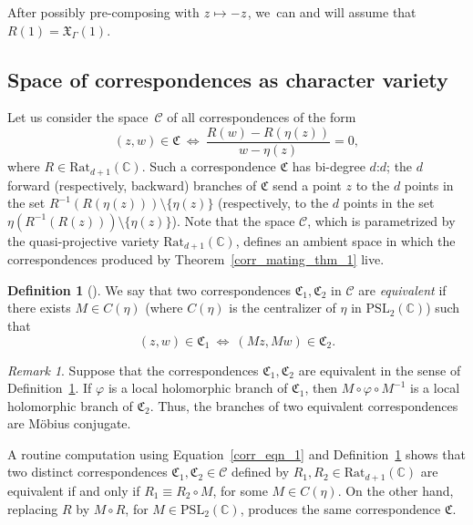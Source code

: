 \documentclass[JEP,XML,SOM,Unicode,NoFloatCountersInSection,published]{cedram}
\def\mto{\mathchoice{\longmapsto}{\mapsto}{\mapsto}{\mapsto}}
\theoremstyle{definition}
\newtheorem{definition}[lemma]{Definition}
\theoremstyle{remark}
\newtheorem{remark}[lemma]{Remark}
\newcommand{\C}{\mathbb{C}}
\newcommand{\pslc}{{\mathrm{PSL}_2 (\mathbb{C})}}
\let\phi\varphi
\begin{document}
After possibly pre-composing with $z\mto -z$, we~can and will assume that $R(1)=\mathfrak{X}_\Gamma(1)$.

\subsection{Space of correspondences as character variety}\label{corr_mod_space_subsec}

Let us consider the space~$\mathscr{C}$ of all correspondences of the form
\begin{equation}
(z,w)\in\mathfrak{C}\ \iff\ \frac{R(w)-R(\eta(z))}{w-\eta(z)}=0,
\label{corr_eqn_1}
\end{equation}
where $R\in\mathrm{Rat}_{d+1}(\C)$. Such a correspondence $\mathfrak{C}$ has bi-degree $d$:$d$; the $d$ forward (respectively, backward) branches of $\mathfrak{C}$ send a point $z$ to the $d$ points in the set $R^{-1}(R(\eta(z)))\setminus\{\eta(z)\}$ (respectively, to the $d$ points in the set $\eta(R^{-1}(R(z)))\setminus\{\eta(z)\}$). Note that the space $\mathscr{C}$, which is parametrized by the quasi-projective variety $\mathrm{Rat}_{d+1}(\C)$, defines an ambient space in which the correspondences produced by Theorem~\ref{corr_mating_thm_1} live.

\begin{definition}[{\cf \cite[\S 2]{BP94}}]\label{equiv_corr_def}
We say that two correspondences $\mathfrak{C}_1, \mathfrak{C}_2$ in $\mathscr{C}$ are \emph{equivalent} if there exists $M\in C(\eta)$ (where $C(\eta)$ is the centralizer of $\eta$ in $\mathrm{PSL}_2(\C)$) such that
\[
(z,w)\in\mathfrak{C}_1\ \iff\ (Mz,Mw)\in\mathfrak{C}_2.
\]
\end{definition}
\begin{remark}
Suppose that the correspondences $\mathfrak{C}_1, \mathfrak{C}_2$ are equivalent in the sense of Definition~\ref{equiv_corr_def}. If $\phi$ is a local holomorphic branch of $\mathfrak{C}_1$, then $M\circ\phi\circ M^{-1}$ is a local holomorphic branch of $\mathfrak{C}_2$. Thus, the branches of two equivalent correspondences are Möbius conjugate.
\end{remark}

A routine computation using Equation~\eqref{corr_eqn_1} and Definition~\ref{equiv_corr_def} shows that two distinct correspondences $\mathfrak{C}_1, \mathfrak{C}_2\in\mathscr{C}$ defined by $R_1, R_2\in\mathrm{Rat}_{d+1}(\C)$ are equivalent if and only if $R_1\equiv R_2\circ M$, for some $M\in C(\eta)$. On the other hand, replacing $R$ by $M\circ R$, for $M\in\pslc$, produces the same correspondence $\mathfrak{C}$.
\end{document}

